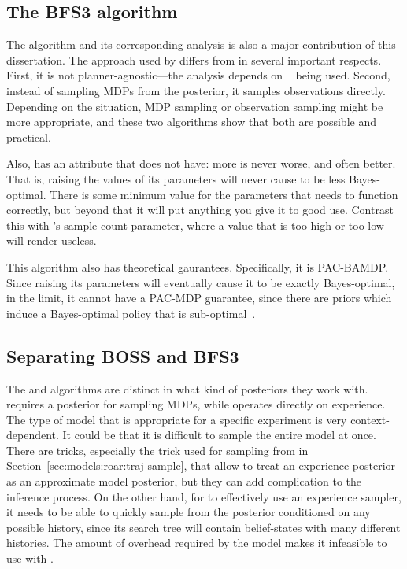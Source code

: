 \subsection{The BFS3 algorithm}

The  algorithm and its corresponding analysis is also a major contribution of this dissertation. The approach used by  differs from  in several important respects. First, it is not planner-agnostic---the analysis depends on ~\cite{walsh10} being used. Second, instead of sampling MDPs from the posterior, it samples observations directly. Depending on the situation, MDP sampling or observation sampling might be more appropriate, and these two algorithms show that both are possible and practical.

Also,  has an attribute that  does not have: more is never worse, and often better. That is, raising the values of its parameters will never cause  to be less Bayes-optimal. There is some minimum value for the parameters that  needs to function correctly, but beyond that it will put anything you give it to good use. Contrast this with 's sample count parameter, where a value that is too high or too low will render  useless.

This algorithm also has theoretical gaurantees. Specifically, it is PAC-BAMDP. Since raising its parameters will eventually cause it to be exactly Bayes-optimal, in the limit, it cannot have a PAC-MDP guarantee, since there are priors which induce a Bayes-optimal policy that is sub-optimal~\cite{lihong09bopac}.

\subsection{Separating BOSS and BFS3}

The  and  algorithms are distinct in what kind of posteriors they work with.  requires a posterior for sampling MDPs, while  operates directly on experience. The type of model that is appropriate for a specific experiment is very context-dependent. It could be that it is difficult to sample the entire model at once. There are tricks, especially the trick used for sampling from  in Section~\ref{sec:models:roar:traj-sample}, that allow  to treat an experience posterior as an approximate model posterior, but they can add complication to the inference process. On the other hand, for  to effectively use an experience sampler, it needs to be able to quickly sample from the posterior conditioned on any possible history, since its search tree will contain belief-states with many different histories. The amount of overhead required by the  model makes it infeasible to use with .

